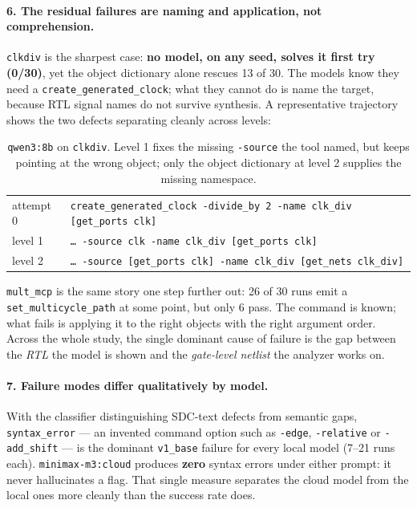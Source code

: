 \documentclass[11pt]{article}
\begin{document}
\paragraph{6. The residual failures are naming and application, not comprehension.} \texttt{clkdiv} is the sharpest case: \textbf{no model, on any seed, solves it first try (0/30)}, yet the object dictionary alone rescues 13 of 30. The models know they need a \texttt{create\_generated\_clock}; what they cannot do is name the target, because RTL signal names do not survive synthesis. A representative trajectory shows the two defects separating cleanly across levels:

\begin{table}[h]
\centering
\small
\begin{tabular}{ll}
\toprule
attempt 0 & \texttt{create\_generated\_clock -divide\_by 2 -name clk\_div [get\_ports clk]} \\
level 1   & \texttt{\dots{} -source clk -name clk\_div [get\_ports clk]} \\
level 2   & \texttt{\dots{} -source [get\_ports clk] -name clk\_div [get\_nets clk\_div]} \\
\bottomrule
\end{tabular}
\caption*{\small \texttt{qwen3:8b} on \texttt{clkdiv}. Level 1 fixes the missing \texttt{-source} the tool named, but keeps pointing at the wrong object; only the object dictionary at level 2 supplies the missing namespace.}
\end{table}

\texttt{mult\_mcp} is the same story one step further out: 26 of 30 runs emit a \texttt{set\_multicycle\_path} at some point, but only 6 pass. The command is known; what fails is applying it to the right objects with the right argument order. Across the whole study, the single dominant cause of failure is the gap between the \emph{RTL} the model is shown and the \emph{gate-level netlist} the analyzer works on.

\paragraph{7. Failure modes differ qualitatively by model.} With the classifier distinguishing SDC-text defects from semantic gaps, \texttt{syntax\_error} --- an invented command option such as \texttt{-edge}, \texttt{-relative} or \texttt{-add\_shift} --- is the dominant \texttt{v1\_base} failure for every local model (7--21 runs each). \texttt{minimax-m3:cloud} produces \textbf{zero} syntax errors under either prompt: it never hallucinates a flag. That single measure separates the cloud model from the local ones more cleanly than the success rate does.
\end{document}
